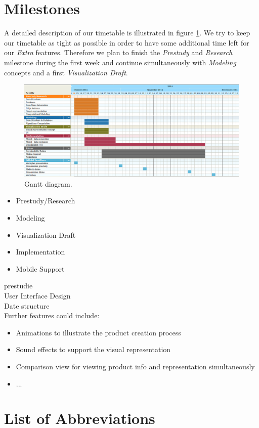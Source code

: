 \documentclass[a4page]{article}
\begin{document}
\section{Milestones}

A detailed description of our timetable is illustrated in figure \ref{fig:gant-diagram}. We try to keep our timetable as tight as possible in order to have some additional time left for our \textit{Extra} features. Therefore we plan to finish the \textit{Prestudy} and \textit{Research} milestone during the first week and continue simultaneously with \textit{Modeling} concepts and a first \textit{Visualization Draft}. 

\begin{figure}[ht]
 \centering
 \includegraphics[scale=0.5]{gantt.png}
 \caption{Gantt diagram.}
 \label{fig:gant-diagram}
\end{figure}

\begin{itemize}
  \item Prestudy/Research
  \item Modeling
  \item Visualization Draft
  \item Implementation
  \item Mobile Support
  \
\end{itemize}
prestudie\\
User Interface Design\\
Date structure\\

Further features could include:
\begin{itemize}
\item Animations to illustrate the product creation process
\item Sound effects to support the visual representation
\item Comparison view for viewing product info and representation simultaneously
\item ...
\end{itemize}

\newpage
\section*{List of Abbreviations}
\begin{acronym}
\end{acronym}



\end{document}
